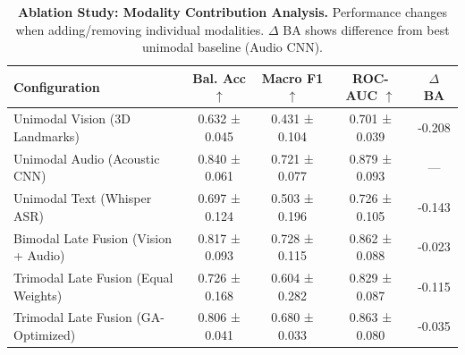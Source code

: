 \begin{table}[t]
\centering
\caption{\textbf{Ablation Study: Modality Contribution Analysis.} Performance changes when adding/removing individual modalities. $\Delta$ BA shows difference from best unimodal baseline (Audio CNN).}
\label{tab:ablation}
\small
\begin{tabular}{lccc|c}
\toprule
\textbf{Configuration} & \textbf{Bal. Acc $\uparrow$} & \textbf{Macro F1 $\uparrow$} & \textbf{ROC-AUC $\uparrow$} & \textbf{$\Delta$ BA} \\
\midrule
Unimodal Vision (3D Landmarks) & 0.632 ± 0.045 & 0.431 ± 0.104 & 0.701 ± 0.039 & -0.208 \\
Unimodal Audio (Acoustic CNN) & 0.840 ± 0.061 & 0.721 ± 0.077 & 0.879 ± 0.093 & — \\
Unimodal Text (Whisper ASR) & 0.697 ± 0.124 & 0.503 ± 0.196 & 0.726 ± 0.105 & -0.143 \\
Bimodal Late Fusion (Vision + Audio) & 0.817 ± 0.093 & 0.728 ± 0.115 & 0.862 ± 0.088 & -0.023 \\
Trimodal Late Fusion (Equal Weights) & 0.726 ± 0.168 & 0.604 ± 0.282 & 0.829 ± 0.087 & -0.115 \\
Trimodal Late Fusion (GA-Optimized) & 0.806 ± 0.041 & 0.680 ± 0.033 & 0.863 ± 0.080 & -0.035 \\
\bottomrule
\end{tabular}
\end{table}
